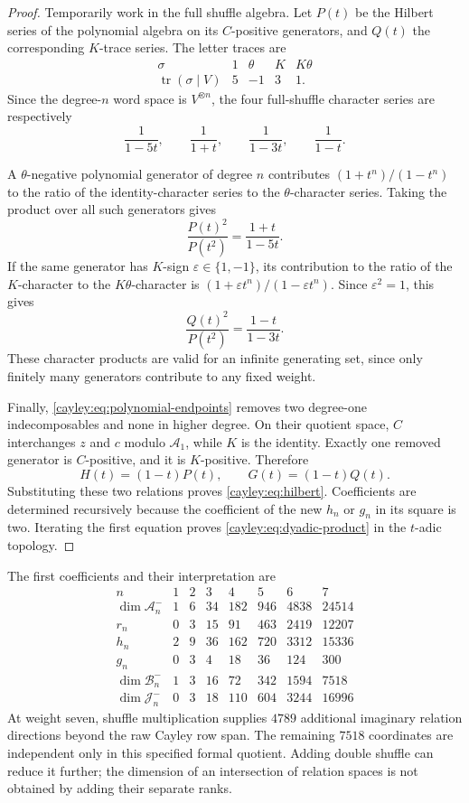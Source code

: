 \begin{proof}
Temporarily work in the full shuffle algebra.  Let $P(t)$ be the
Hilbert series of the polynomial algebra on its $C$-positive
generators, and $Q(t)$ the corresponding $K$-trace series.
The letter traces are
\[
\begin{array}{c|rrrr}
\sigma&1&\theta&K&K\theta\\ \hline
\operatorname{tr}(\sigma\mid V)&5&-1&3&1 .
\end{array}
\]
Since the degree-$n$ word space is $V^{\otimes n}$, the four
full-shuffle character series are respectively
\[
 \frac1{1-5t},\qquad\frac1{1+t},\qquad
 \frac1{1-3t},\qquad\frac1{1-t}.
\]

A $\theta$-negative polynomial generator of degree $n$ contributes
$(1+t^n)/(1-t^n)$ to the ratio of the identity-character series
to the $\theta$-character series.  Taking the product over all
such generators gives
\[
 \frac{P(t)^2}{P(t^2)}=\frac{1+t}{1-5t}.
\]
If the same generator has $K$-sign $\varepsilon\in\{1,-1\}$,
its contribution to the ratio of the $K$-character to the
$K\theta$-character is
$(1+\varepsilon t^n)/(1-\varepsilon t^n)$.
Since $\varepsilon^2=1$, this gives
\[
 \frac{Q(t)^2}{P(t^2)}=\frac{1-t}{1-3t}.
\]
These character products are valid for an infinite generating
set, since only finitely many generators contribute to any fixed
weight.

Finally, \eqref{cayley:eq:polynomial-endpoints} removes two
degree-one indecomposables and none in higher degree.
On their quotient space, $C$ interchanges $z$ and $c$ modulo
$\mathcal A_1$, while $K$ is the identity.  Exactly one removed
generator is $C$-positive, and it is $K$-positive.  Therefore
\[
 H(t)=(1-t)P(t),\qquad G(t)=(1-t)Q(t).
\]
Substituting these two relations proves
\eqref{cayley:eq:hilbert}.  Coefficients are determined recursively
because the coefficient of the new $h_n$ or $g_n$ in its square
is two.  Iterating the first equation proves
\eqref{cayley:eq:dyadic-product} in the $t$-adic topology.
\end{proof}

The first coefficients and their interpretation are
\[
\begin{array}{c|rrrrrrr}
n&1&2&3&4&5&6&7\\ \hline
\dim\mathcal A_n^-&1&6&34&182&946&4838&24514\\
r_n&0&3&15&91&463&2419&12207\\
h_n&2&9&36&162&720&3312&15336\\
g_n&0&3&4&18&36&124&300\\
\dim\mathcal B_n^-&1&3&16&72&342&1594&7518\\
\dim\mathcal J_n^-&0&3&18&110&604&3244&16996
\end{array}
\]
At weight seven, shuffle multiplication supplies $4789$ additional
imaginary relation directions beyond the raw Cayley row span.
The remaining $7518$ coordinates are independent only in this
specified formal quotient.  Adding double shuffle can reduce it
further; the dimension of an intersection of relation spaces is not
obtained by adding their separate ranks.

